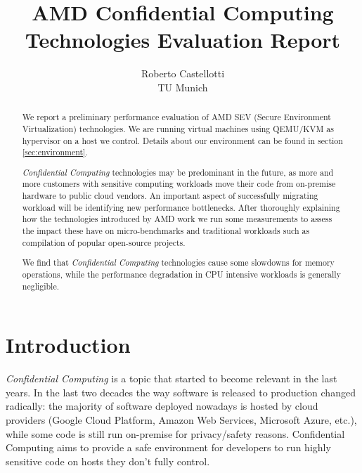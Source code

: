 \documentclass[twocolumn]{article}
\begin{document}
\date{}
\title{\Large \bf AMD Confidential Computing Technologies Evaluation Report}
\author{{\rm Roberto Castellotti}\\TU Munich}
\maketitle

\begin{abstract}
We report a preliminary performance evaluation of AMD SEV (Secure Environment Virtualization) technologies.
We are running virtual machines using QEMU/KVM as hypervisor on a host we control.
Details about our environment can be found in section \ref{sec:environment}.

\textit{Confidential Computing} technologies may be predominant in the future, as more and more customers with sensitive computing workloads move their code  from on-premise hardware to public cloud vendors. An important aspect of successfully migrating workload will be identifying new performance bottlenecks. After thoroughly explaining how the technologies introduced by AMD work we run some measurements to assess the impact these have on micro-benchmarks and traditional workloads such as compilation of popular open-source projects.

We find that \textit{Confidential Computing} technologies cause some slowdowns for memory operations, while the performance degradation in CPU intensive workloads is generally negligible.
\end{abstract}

\section{Introduction}

\textit{Confidential Computing} is a topic that started to become relevant in the last years. In the last two decades the way software is released to production changed radically: the majority of software deployed nowadays is hosted by cloud providers (Google Cloud Platform, Amazon Web Services, Microsoft Azure, etc.), while some code is still run on-premise for privacy/safety reasons. Confidential Computing aims to provide a safe environment for developers to run highly sensitive code on hosts they don't fully control. 
\end{document}

